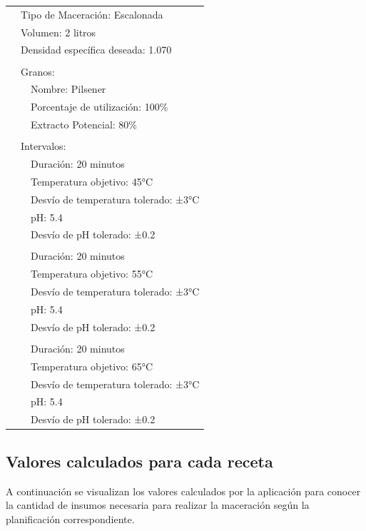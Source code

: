 \begin{longtable}{p{0.6cm} p{0.6cm} p{12.8cm}}
        & \multicolumn{2}{l}{Tipo de Maceración: Escalonada} \\
        & \multicolumn{2}{l}{Volumen: 2 litros}  \\
        & \multicolumn{2}{l}{Densidad específica deseada: 1.070} \\
        & & \\
        & \multicolumn{2}{l}{Granos:} \\
        & & Nombre: Pilsener \\
        & & Porcentaje de utilización: 100\% \\
        & & Extracto Potencial: 80\% \\
        & & \\
        & \multicolumn{2}{l}{Intervalos:} \\
        & & Duración: 20 minutos \\
        & & Temperatura objetivo: 45°C \\
        & & Desvío de temperatura tolerado: ±3°C \\
        & & pH: 5.4 \\
        & & Desvío de pH tolerado: ±0.2 \\
        & & \\
        & & Duración: 20 minutos \\
        & & Temperatura objetivo: 55°C \\
        & & Desvío de temperatura tolerado: ±3°C \\
        & & pH: 5.4 \\
        & & Desvío de pH tolerado: ±0.2 \\
        & & \\
        & & Duración: 20 minutos \\
        & & Temperatura objetivo: 65°C \\
        & & Desvío de temperatura tolerado: ±3°C \\
        & & pH: 5.4 \\
        & & Desvío de pH tolerado: ±0.2 \\

        \end{longtable}
    
    \subsection{Valores calculados para cada receta}
    \par A continuación se visualizan los valores calculados por la aplicación para conocer la cantidad de insumos necesaria para realizar la maceración según la planificación correspondiente.
    

